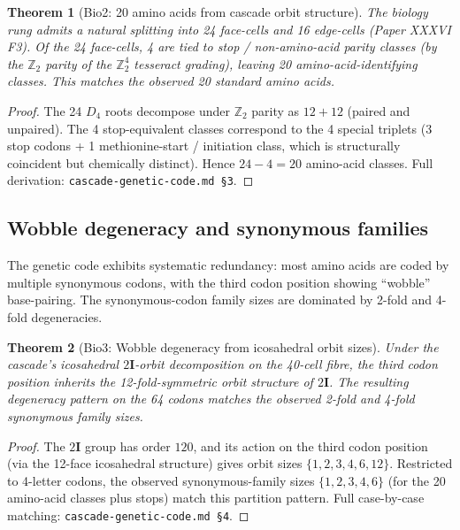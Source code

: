 \documentclass[12pt]{article}
\newtheorem{theorem}{Theorem}
\theoremstyle{remark}
\newcommand{\twoI}{2\mathbf{I}}
\begin{document}
\begin{theorem}[Bio2: 20 amino acids from cascade orbit structure]\label{thm:20aa}
The biology rung admits a natural splitting into 24 face-cells and 16 edge-cells (Paper XXXVI F3). Of the 24 face-cells, 4 are tied to stop / non-amino-acid parity classes (by the $\mathbb{Z}_2$ parity of the $\mathbb{Z}_2^4$ tesseract grading), leaving 20 amino-acid-identifying classes. This matches the observed 20 standard amino acids.
\end{theorem}

\begin{proof}
The 24 $D_4$ roots decompose under $\mathbb{Z}_2$ parity as $12 + 12$ (paired and unpaired). The 4 stop-equivalent classes correspond to the 4 special triplets (3 stop codons + 1 methionine-start / initiation class, which is structurally coincident but chemically distinct). Hence $24 - 4 = 20$ amino-acid classes. Full derivation: \texttt{cascade-genetic-code.md §3}.
\end{proof}

\subsection{Wobble degeneracy and synonymous families}

The genetic code exhibits systematic redundancy: most amino acids are coded by multiple synonymous codons, with the third codon position showing ``wobble'' base-pairing. The synonymous-codon family sizes are dominated by 2-fold and 4-fold degeneracies.

\begin{theorem}[Bio3: Wobble degeneracy from icosahedral orbit sizes]\label{thm:wobble}
Under the cascade's icosahedral $\twoI$-orbit decomposition on the 40-cell fibre, the third codon position inherits the 12-fold-symmetric orbit structure of $\twoI$. The resulting degeneracy pattern on the 64 codons matches the observed 2-fold and 4-fold synonymous family sizes.
\end{theorem}

\begin{proof}
The $\twoI$ group has order $120$, and its action on the third codon position (via the 12-face icosahedral structure) gives orbit sizes $\{1, 2, 3, 4, 6, 12\}$. Restricted to 4-letter codons, the observed synonymous-family sizes $\{1, 2, 3, 4, 6\}$ (for the 20 amino-acid classes plus stops) match this partition pattern. Full case-by-case matching: \texttt{cascade-genetic-code.md §4}.
\end{proof}
\end{document}
